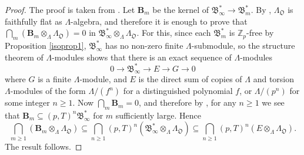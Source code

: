 \documentclass[a4paper,11pt]{amsart}
\numberwithin{equation}{section}
\theoremstyle{plain}
\theoremstyle{definition}
\theoremstyle{remark}
\newcommand{\Z}{\mathbb{Z}}
\begin{document}
\begin{proof} The proof is taken from \cite[Lemma 2.1.6]{OhtaMA}.
    Let $\mathbf{B}_m$ be the kernel of $\mathfrak{B}_\infty^*\rightarrow \mathfrak{B}_m^*$. 
    By \cite[Lemma (2.1.1)]{OhtaMA}, $\Lambda_\mathfrak{O}$ is faithfully flat as $\Lambda$-algebra, and therefore it is enough to prove 
    that $\bigcap_m(\mathbf{B}_m\otimes_{\Lambda}\Lambda_\mathfrak{O})=0$ in $\mathfrak{B}_\infty^*\otimes_\Lambda\Lambda_\mathfrak{O}$. For this, 
    since each $\mathfrak{B}_m^*$ is $\Z_p$-free by Proposition \ref{isoprop1}, $\mathfrak{B}_\infty^*$ has no non-zero finite $\Lambda$-submodule, 
    so the structure theorem of $\Lambda$-modules shows that there is an exact sequence of $\Lambda$-modules 
    \[0\longrightarrow \mathfrak{B}_\infty^*\longrightarrow E\longrightarrow G\longrightarrow0 \]
where $G$ is a finite $\Lambda$-module, and $E$ is the direct sum of copies of $\Lambda$ and torsion $\Lambda$-modules of the form $\Lambda/(f^n)$ 
for a distinguished polynomial $f$, or $\Lambda/(p^n)$ for some integer $n\geq 1$. Now $\bigcap_m\mathbf{B}_m=0$, and therefore by \cite[IV, \S2, Cor.4]{Bourbaki-CA}, for any $n\ge 1$ we see that 
$\mathbf{B}_m\subseteq (p,T)^n\mathfrak{B}_\infty^*$ for $m$ sufficiently large. Hence 
\[\bigcap_{m\geq 1}\left(\mathbf{B}_m\otimes_{\Lambda}\Lambda_\mathfrak{O}\right)\subseteq \bigcap_{n\geq 1}(p,T)^n (\mathfrak{B}_\infty^*\otimes_\Lambda\Lambda_\mathfrak{O})
\subseteq \bigcap_{n\geq 1}(p,T)^n\left(E\otimes_\Lambda\Lambda_\mathfrak{O}\right).\]
The result follows.
\end{proof}
\end{document}
